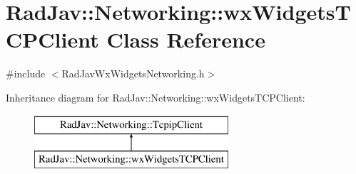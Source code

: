 \hypertarget{class_rad_jav_1_1_networking_1_1wx_widgets_t_c_p_client}{}\section{Rad\+Jav\+:\+:Networking\+:\+:wx\+Widgets\+T\+C\+P\+Client Class Reference}
\label{class_rad_jav_1_1_networking_1_1wx_widgets_t_c_p_client}


{\ttfamily \#include $<$Rad\+Jav\+Wx\+Widgets\+Networking.\+h$>$}

Inheritance diagram for Rad\+Jav\+:\+:Networking\+:\+:wx\+Widgets\+T\+C\+P\+Client\+:\begin{figure}[H]
\begin{center}
\leavevmode
\includegraphics[height=2.000000cm]{class_rad_jav_1_1_networking_1_1wx_widgets_t_c_p_client}
\end{center}
\end{figure}
